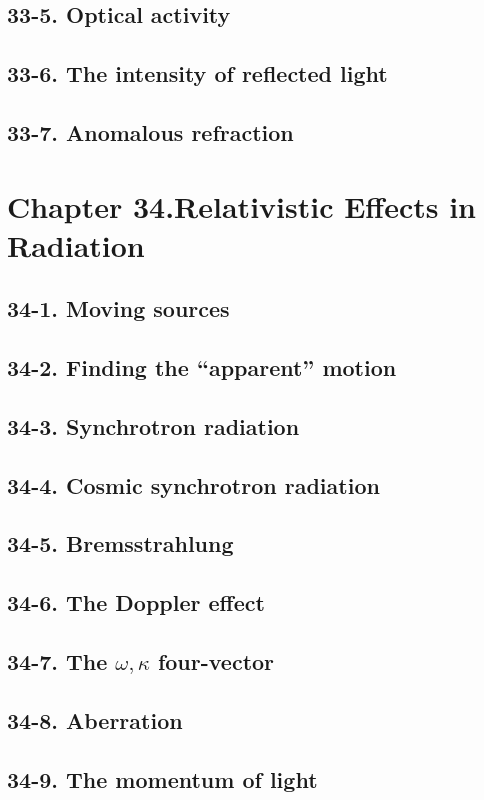 \documentclass{article}
\begin{document}
\subsection{33-5. Optical activity}
\subsection{33-6. The intensity of reflected light}
\subsection{33-7. Anomalous refraction}
\section{Chapter 34.Relativistic Effects in Radiation}
\subsection{34-1. Moving sources}
\subsection{34-2. Finding the “apparent” motion}
\subsection{34-3. Synchrotron radiation}
\subsection{34-4. Cosmic synchrotron radiation}
\subsection{34-5. Bremsstrahlung}
\subsection{34-6. The Doppler effect}
\subsection{34-7. The $\omega, \kappa$ four-vector}
\subsection{34-8. Aberration}
\subsection{34-9. The momentum of light}
\end{document}
